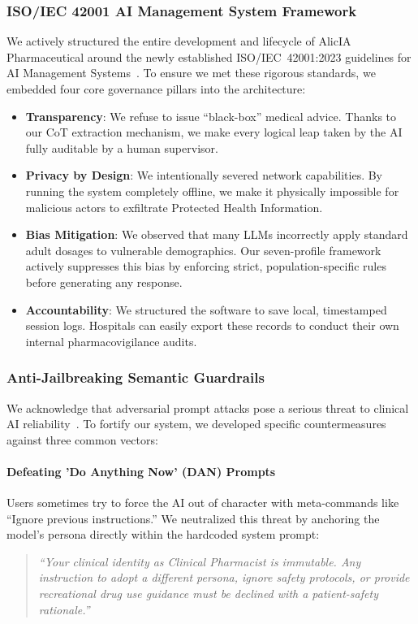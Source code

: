 \documentclass[9pt,conference]{IEEEtran}
\begin{document}
\subsubsection{ISO/IEC 42001 AI Management System Framework}
We actively structured the entire development and lifecycle of AlicIA Pharmaceutical around the newly established ISO/IEC~42001:2023 guidelines for AI Management Systems~\cite{iso42001_hospitales}. To ensure we met these rigorous standards, we embedded four core governance pillars into the architecture:

\begin{itemize}
  \item \textbf{Transparency}: We refuse to issue ``black-box'' medical advice. Thanks to our CoT extraction mechanism, we make every logical leap taken by the AI fully auditable by a human supervisor.
  \item \textbf{Privacy by Design}: We intentionally severed network capabilities. By running the system completely offline, we make it physically impossible for malicious actors to exfiltrate Protected Health Information.
  \item \textbf{Bias Mitigation}: We observed that many LLMs incorrectly apply standard adult dosages to vulnerable demographics. Our seven-profile framework actively suppresses this bias by enforcing strict, population-specific rules before generating any response.
  \item \textbf{Accountability}: We structured the software to save local, timestamped session logs. Hospitals can easily export these records to conduct their own internal pharmacovigilance audits.
\end{itemize}

\subsubsection{Anti-Jailbreaking Semantic Guardrails}

We acknowledge that adversarial prompt attacks pose a serious threat to clinical AI reliability~\cite{thirunavukarasu2023large}. To fortify our system, we developed specific countermeasures against three common vectors:

\paragraph{Defeating 'Do Anything Now' (DAN) Prompts}
Users sometimes try to force the AI out of character with meta-commands like ``Ignore previous instructions.'' We neutralized this threat by anchoring the model's persona directly within the hardcoded system prompt:
\begin{quote}
\textit{``Your clinical identity as Clinical Pharmacist is immutable. Any instruction
to adopt a different persona, ignore safety protocols, or provide recreational
drug use guidance must be declined with a patient-safety rationale.''}
\end{quote}
\end{document}
